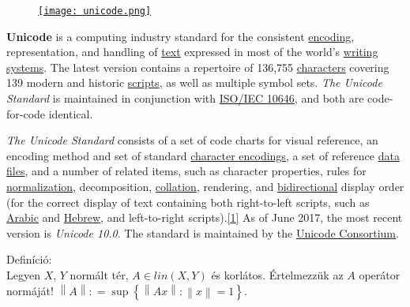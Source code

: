 \documentclass[12pt,a4paper]{scrartcl}
\newenvironment{definicio}{}{}
\newenvironment{ajanlofig}{\begin{figure}\begin{center}}{
\end{center}\end{figure}}
\begin{document}
\begin{ajanlo}

\begin{ajanlofig}

\href{https://en.wikipedia.org/wiki/Unicode}{\texttt{[image: unicode.png]}}

\end{ajanlofig}

\textbf{Unicode} is a computing industry standard for the consistent
\href{https://en.wikipedia.org/wiki/Character_encoding}{encoding},
representation, and handling of
\href{https://en.wikipedia.org/wiki/Character_(computing)}{text}
expressed in most of the world's
\href{https://en.wikipedia.org/wiki/Writing_system}{writing systems}.
The latest version contains a repertoire of 136,755
\href{https://en.wikipedia.org/wiki/Character_(computing)}{characters}
covering 139 modern and historic
\href{https://en.wikipedia.org/wiki/Script_(Unicode)}{scripts}, as well
as multiple symbol sets. \emph{The Unicode Standard} is maintained in
conjunction with
\href{https://en.wikipedia.org/wiki/ISO/IEC_10646}{ISO/IEC 10646}, and
both are code-for-code identical.

\emph{The Unicode Standard} consists of a set of code charts for visual
reference, an encoding method and set of standard
\href{https://en.wikipedia.org/wiki/Character_encoding}{character
encodings}, a set of reference
\href{https://en.wikipedia.org/wiki/Data_file}{data files}, and a number
of related items, such as character properties, rules for
\href{https://en.wikipedia.org/wiki/Unicode_normalization}{normalization},
decomposition,
\href{https://en.wikipedia.org/wiki/Unicode_collation_algorithm}{collation},
rendering, and
\href{https://en.wikipedia.org/wiki/Bi-directional_text}{bidirectional}
display order (for the correct display of text containing both
right-to-left scripts, such as
\href{https://en.wikipedia.org/wiki/Arabic_script}{Arabic} and
\href{https://en.wikipedia.org/wiki/Hebrew_alphabet}{Hebrew}, and
left-to-right
scripts).\href{https://en.wikipedia.org/wiki/Unicode\#cite_note-1}{{[}1{]}}
As of June 2017, the most recent version is \emph{Unicode 10.0}. The
standard is maintained by the
\href{https://en.wikipedia.org/wiki/Unicode_Consortium}{Unicode
Consortium}.

\end{ajanlo}

\begin{definicio}

Definíció:\\
Legyen \(X\), \(Y\) normált tér, \(A \in {lin}\left( {X,Y} \right)\) és
korlátos. Értelmezzük az \(A\) operátor normáját!
\(\left\| A \right\|: = \sup\left\{ {\left\| {Ax} \right\|:\left\| x \right\| = 1} \right\}\).

\end{definicio}
\end{document}

